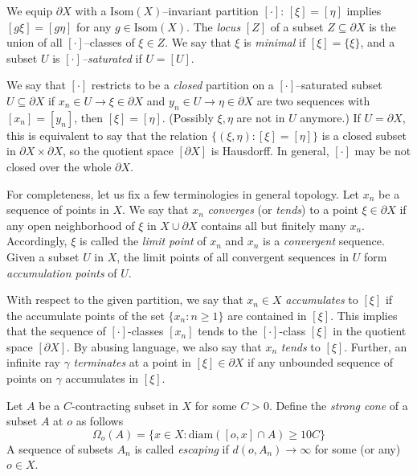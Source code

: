 \documentclass{amsart}
\theoremstyle{definition}
\theoremstyle{remark}
\newcommand{\isom}{\textrm{Isom}}
\newcommand{\U}{ X}
\newcommand{\pU}{\partial{  X}}
\begin{document}
We   equip $\pU$    with a  $\isom(\U)$--invariant  partition $[\cdot]$:   $[\xi]=[\eta]$ implies $[g\xi]=[g\eta]$ for any $g\in \isom(\U)$.   The  \textit{locus} $[Z]$  of a subset $Z\subseteq\pU$ is the union of all $[\cdot]$--classes of $\xi\in Z$.  We say that $\xi$ is \textit{minimal} if $[\xi]=\{\xi\}$, and a subset $U$ is \textit{$[\cdot]$--saturated} if $U=[U]$.

We say that $[\cdot]$ restricts to be a \textit{closed} partition on a $[\cdot]$--saturated subset $U\subseteq \pU$ if  $x_n\in U\to \xi\in \pU$ and $y_n\in U\to\eta\in \pU$ are two sequences with $[x_n]=[ y_n]$, then $[\xi]=[\eta]$. (Possibly $\xi, \eta$ are not in $U$ anymore.) If $U=\pU$, this is equivalent to say that the relation $\{(\xi,\eta): [\xi]=[\eta]\}$ is a closed subset in $\pU\times \pU$, so the quotient space $[\pU]$ is Hausdorff. In general, $[\cdot]$ may  be not closed over the whole $\pU$.%

For completeness, let us fix a few terminologies in general topology. 
Let $x_n$ be a sequence of points in $\U$. We say that $x_n$ \textit{converges} (or \textit{tends}) to a point $\xi\in \pU$  if any open neighborhood of $\xi$ in $\U\cup \pU$ contains all but finitely many $x_n$. Accordingly, $\xi$ is called the \textit{limit point} of $x_n$ and  $x_n$ is  a \textit{convergent} sequence. Given a subset $U$ in $X$, the limit points of all convergent sequences in  $U$ form \textit{accumulation points} of $U$.

With respect to the given partition, we say that  $x_n\in X$ \textit{accumulates}  to $[\xi]$ if the  accumulate points of the set $\{x_n: n\ge 1\}$ are contained in $[\xi]$. This implies that the sequence of $[\cdot]$-classes $[x_n]$ tends to the $[\cdot]$-class $[\xi]$ in the quotient space $[\pU]$. By abusing language, we also say that $x_n$ \textit{tends} to $[\xi]$. Further,  an infinite ray $\gamma$ \textit{terminates} at a point in $[\xi] \in \pU$ if any unbounded sequence of points on $\gamma$ accumulates in $[\xi]$. 

Let $A$ be a $C$-contracting subset in $\U$ for some $C>0$. Define the \textit{strong cone} of a subset $A$  at $o$ as follows $$\Omega_o(A)=\{x\in \U: \mathrm{diam}([o,x]\cap A)\ge 10C\}$$ A sequence of subsets $A_n$ is called \textit{escaping} if $d(o,A_n)\to \infty$ for some (or any) $o\in \U$.
\end{document}
